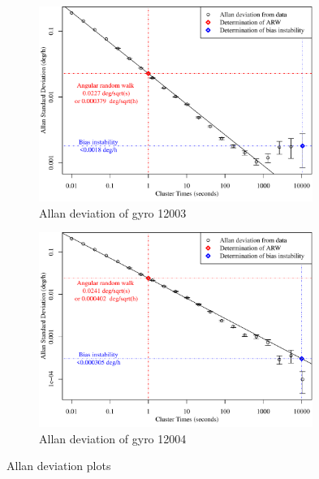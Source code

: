 \begin{figure}[!h]
	\begin{subfigure}[b]{0.5\textwidth}
		\centering
		\includegraphics[width=0.98\textwidth]{Figures/allandev_12003.pdf} 
		\caption{Allan deviation of gyro 12003}
		\label{subfig:allan12003}
	\end{subfigure}
	\begin{subfigure}[b]{0.5\textwidth}
		\centering
		\includegraphics[width=0.98\textwidth]{Figures/allandev_12004.pdf} 
		\caption{Allan deviation of gyro 12004}
		\label{subfig:allan12004}
	\end{subfigure}
\caption{Allan deviation plots}
\label{fig:allandeviation}
\end{figure}


